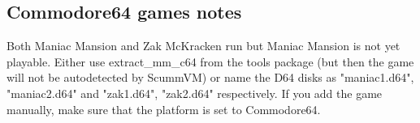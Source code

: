 


\subsection{Commodore64 games notes}

Both Maniac Mansion and Zak McKracken run but Maniac Mansion is not yet
playable. Either use extract\_mm\_c64 from the tools package (but then the
game will not be autodetected by ScummVM) or name the D64 disks as
"maniac1.d64", "maniac2.d64" and "zak1.d64", "zak2.d64" respectively.
If you add the game manually, make sure that the platform is set to
Commodore64.
